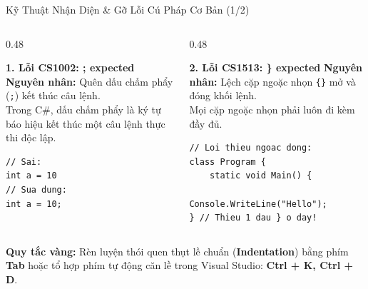 \documentclass[aspectratio=169, 10pt]{beamer}
\begin{document}
\begin{frame}[fragile]{Kỹ Thuật Nhận Diện \& Gỡ Lỗi Cú Pháp Cơ Bản (1/2)}
  \begin{columns}[T]
    \begin{column}{0.48\textwidth}
      \begin{alertblock}{\textbf{1. Lỗi CS1002: ; expected}}
        \textbf{Nguyên nhân:} Quên dấu chấm phẩy (\texttt{;}) kết thúc câu lệnh.\\
        Trong C\#, dấu chấm phẩy là ký tự báo hiệu kết thúc một câu lệnh thực thi độc lập.
\begin{lstlisting}
// Sai:
int a = 10
// Sua dung:
int a = 10;
\end{lstlisting}
      \end{alertblock}
    \end{column}
    \begin{column}{0.48\textwidth}
      \begin{alertblock}{\textbf{2. Lỗi CS1513: \} expected}}
        \textbf{Nguyên nhân:} Lệch cặp ngoặc nhọn \texttt{\{\}} mở và đóng khối lệnh.\\
        Mọi cặp ngoặc nhọn phải luôn đi kèm đầy đủ.
\begin{lstlisting}
// Loi thieu ngoac dong:
class Program {
    static void Main() {
        Console.WriteLine("Hello");
} // Thieu 1 dau } o day!
\end{lstlisting}
      \end{alertblock}
    \end{column}
  \end{columns}
  \begin{tcolorbox}[colback=UniLightBlue!30,colframe=UniBlue]
    \textbf{Quy tắc vàng:} Rèn luyện thói quen thụt lề chuẩn (\textbf{Indentation}) bằng phím \textbf{Tab} hoặc tổ hợp phím tự động căn lề trong Visual Studio: \textbf{Ctrl + K, Ctrl + D}.
  \end{tcolorbox}
\end{frame}
\end{document}
